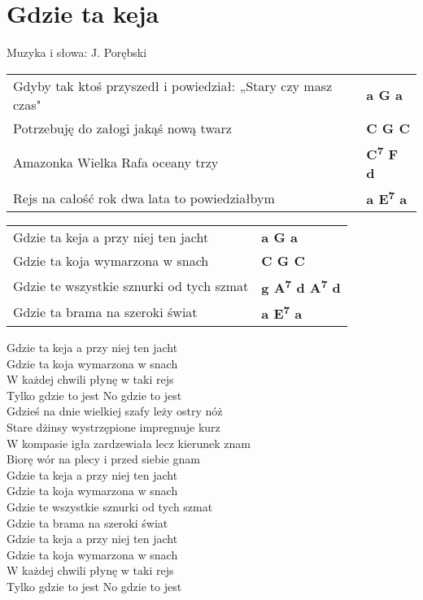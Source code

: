 		
\section{Gdzie ta keja}
Muzyka i słowa: J. Porębski\\

\vspace{2em}
\noindent
\begin{tabular}{@{}p{10cm}@{}l@{}}
Gdyby tak ktoś przyszedł i powiedział: „Stary czy masz czas" & \bfseries a G a\\
Potrzebuję do załogi jakąś nową twarz & \bfseries C G C\\
Amazonka Wielka Rafa oceany trzy & \bfseries C\textsuperscript{7} F d\\
Rejs na całość rok dwa lata to powiedziałbym & \bfseries a E\textsuperscript{7} a\\
\end{tabular}

\vspace{1em}
\begin{tabular}{@{}p{10cm}@{}l@{}}
Gdzie ta keja a przy niej ten jacht & \bfseries a G a\\
Gdzie ta koja wymarzona w snach & \bfseries C G C\\
Gdzie te wszystkie sznurki od tych szmat & \bfseries g A\textsuperscript{7} d A\textsuperscript{7} d\\
Gdzie ta brama na szeroki świat & \bfseries a E\textsuperscript{7} a\\
\end{tabular}


Gdzie ta keja a przy niej ten jacht\\
Gdzie ta koja wymarzona w snach \\
W każdej chwili płynę w taki rejs \\
Tylko gdzie to jest No gdzie to jest \\



Gdzieś na dnie wielkiej szafy leży ostry nóż \\
Stare dżinsy wystrzępione impregnuje kurz \\
W kompasie igła zardzewiała lecz kierunek znam \\
Biorę wór na plecy i przed siebie gnam \\


Gdzie ta keja a przy niej ten jacht \\
Gdzie ta koja wymarzona w snach \\
Gdzie te wszystkie sznurki od tych szmat \\
Gdzie ta brama na szeroki świat \\
Gdzie ta keja a przy niej ten jacht \\
Gdzie ta koja wymarzona w snach \\
W każdej chwili płynę w taki rejs \\
Tylko gdzie to jest No gdzie to jest \\



